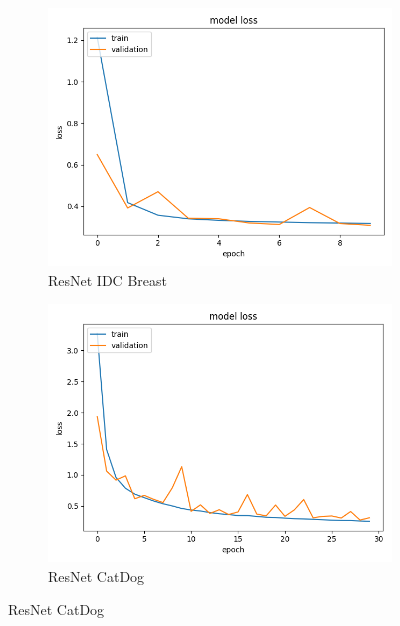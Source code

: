 \begin{figure}[h]
\begin{subfigure}[b]{.45\linewidth}
\includegraphics[width=\linewidth]{Figs/resnet_breast_loss.jpg}
\caption{ResNet IDC Breast}
\end{subfigure}
\begin{subfigure}[b]{.45\linewidth}
\includegraphics[width=\linewidth]{Figs/resnet_catdog_loss.jpg}
\caption{ResNet CatDog}
\end{subfigure}


\end{figure}
